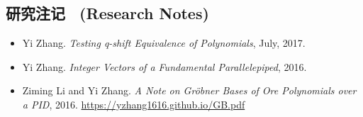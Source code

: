 \documentclass[a4paper,12pt]{article}
\newcommand{\red}{\color{red}}
\begin{document}
\begin{CJK*}{UTF8}{gbsn}
% 

\section*{\Large{研究注记 \ (Research Notes)}}
\begin{itemize}
 \item Yi Zhang. {\em Testing q-shift Equivalence of Polynomials}, July, 2017.
 \item Yi Zhang. {\em Integer Vectors of a Fundamental Parallelepiped}, 2016.
 \item Ziming Li and Yi Zhang. {\em A Note on Gr\"{o}bner Bases of Ore Polynomials over a PID}, 2016. 
 \url{https://yzhang1616.github.io/GB.pdf} 
\end{itemize}


\end{CJK*}
\end{document}
